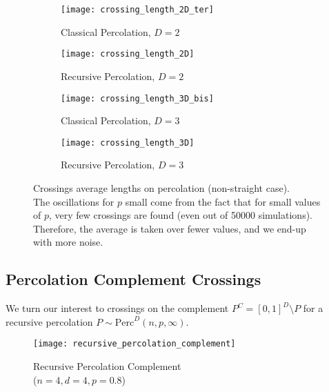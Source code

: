 \begin{figure}[!h]
	\begin{subfigure}{0.45\linewidth}
		\texttt{[image: crossing\_length\_2D\_ter]}
		\centering
		\captionsetup{justification=centering}
		\caption{Classical Percolation, $D=2$}
	\end{subfigure}
	\hspace{0.04\linewidth}
	\begin{subfigure}{0.45\linewidth}
		\texttt{[image: crossing\_length\_2D]}
		\centering
		\captionsetup{justification=centering}
		\caption{Recursive Percolation, $D=2$}
	\end{subfigure}

	\begin{subfigure}{0.45\linewidth}
		\texttt{[image: crossing\_length\_3D\_bis]}
		\centering
		\captionsetup{justification=centering}
		\caption{Classical Percolation, $D=3$}
	\end{subfigure}
	\hspace{0.04\linewidth}
	\begin{subfigure}{0.45\linewidth}
		\texttt{[image: crossing\_length\_3D]}
		\centering
		\captionsetup{justification=centering}
		\caption{Recursive Percolation, $D=3$}
	\end{subfigure}

	\caption{Crossings average lengths on percolation (non-straight case).\\
	The oscillations for $p$ small come from the fact that for small values of $p$, very few crossings are found (even out of 50000 simulations). Therefore, the average is taken over fewer values, and we end-up with more noise.}
	\label{fig:crossingLengths}
\end{figure}


\subsection{Percolation Complement Crossings}
We turn our interest to crossings on the complement $P^C = \left[ 0,1 \right]^D \setminus P$ for a recursive percolation $P \sim \text{Perc}^D(n,p,\infty)$.

\begin{figure}[!h]
	\centering
	\texttt{[image: recursive\_percolation\_complement]}
	\caption{Recursive Percolation Complement\\($n=4, d=4, p=0.8$)}
	\label{fig:recursivePercolationComplement}
\end{figure}

